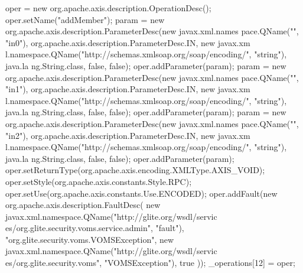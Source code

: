 \begin{DoxyCode}
{        oper = new org.apache.axis.description.OperationDesc();
        oper.setName("addMember");
        param = new org.apache.axis.description.ParameterDesc(new javax.xml.names
      pace.QName("", "in0"), org.apache.axis.description.ParameterDesc.IN, new javax.xm
      l.namespace.QName("http://schemas.xmlsoap.org/soap/encoding/", "string"), java.la
      ng.String.class, false, false);
        oper.addParameter(param);
        param = new org.apache.axis.description.ParameterDesc(new javax.xml.names
      pace.QName("", "in1"), org.apache.axis.description.ParameterDesc.IN, new javax.xm
      l.namespace.QName("http://schemas.xmlsoap.org/soap/encoding/", "string"), java.la
      ng.String.class, false, false);
        oper.addParameter(param);
        param = new org.apache.axis.description.ParameterDesc(new javax.xml.names
      pace.QName("", "in2"), org.apache.axis.description.ParameterDesc.IN, new javax.xm
      l.namespace.QName("http://schemas.xmlsoap.org/soap/encoding/", "string"), java.la
      ng.String.class, false, false);
        oper.addParameter(param);
        oper.setReturnType(org.apache.axis.encoding.XMLType.AXIS_VOID);
        oper.setStyle(org.apache.axis.constants.Style.RPC);
        oper.setUse(org.apache.axis.constants.Use.ENCODED);
        oper.addFault(new org.apache.axis.description.FaultDesc(
                      new javax.xml.namespace.QName("http://glite.org/wsdl/servic
      es/org.glite.security.voms.service.admin", "fault"),
                      "org.glite.security.voms.VOMSException",
                      new javax.xml.namespace.QName("http://glite.org/wsdl/servic
      es/org.glite.security.voms", "VOMSException"), 
                      true
                     ));
        _operations[12] = oper;

}
\end{DoxyCode}
